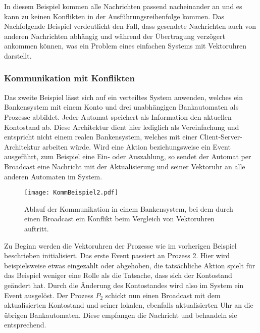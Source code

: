 In diesem Beispiel kommen alle Nachrichten passend nacheinander an und es kann zu keinen Konflikten in der Ausführungsreihenfolge kommen. Das Nachfolgende Beispiel verdeutlicht den Fall, dass gesendete Nachrichten auch von anderen Nachrichten abhängig und während der Übertragung verzögert ankommen können, was ein Problem eines einfachen Systems mit Vektoruhren darstellt.

\subsubsection{Kommunikation mit Konflikten}

Das zweite Beispiel lässt sich auf ein verteiltes System anwenden, welches ein Bankensystem mit einem Konto und drei unabhängigen Bankautomaten als Prozesse abbildet. Jeder Automat speichert als Information den aktuellen Kontostand ab. Diese Architektur dient hier lediglich als Vereinfachung und entspricht nicht einem realen Bankensystem, welches mit einer Client-Server-Architektur arbeiten würde. Wird eine Aktion beziehungsweise ein Event ausgeführt, zum Beispiel eine Ein- oder Auszahlung, so sendet der Automat per Broadcast eine Nachricht mit der Aktualisierung und seiner Vektoruhr an alle anderen Automaten im System.

\begin{figure}[ht]
	\centering
	\texttt{[image: KommBeispiel2.pdf]}
	\caption[Beispiel einer konfliktbehafteten Kommunikation]{Ablauf der Kommunikation in einem Bankensystem, bei dem durch einen Broadcast ein Konflikt beim Vergleich von Vektoruhren auftritt.}
	\label{figure:kommBeispiel2}
\end{figure}
\FloatBarrier

Zu Beginn werden die Vektoruhren der Prozesse wie im vorherigen Beispiel beschrieben initialisiert. Das erste Event passiert an Prozess 2. Hier wird beispielsweise etwas eingezahlt oder abgehoben, die tatsächliche Aktion spielt für das Beispiel weniger eine Rolle als die Tatsache, dass sich der Kontostand geändert hat. Durch die Änderung des Kontostandes wird also im System ein Event ausgelöst. Der Prozess $P_2$ schickt nun einen Broadcast mit dem aktualisierten Kontostand und seiner lokalen, ebenfalls aktualisierten Uhr an die übrigen Bankautomaten. Diese empfangen die Nachricht und behandeln sie entsprechend.

